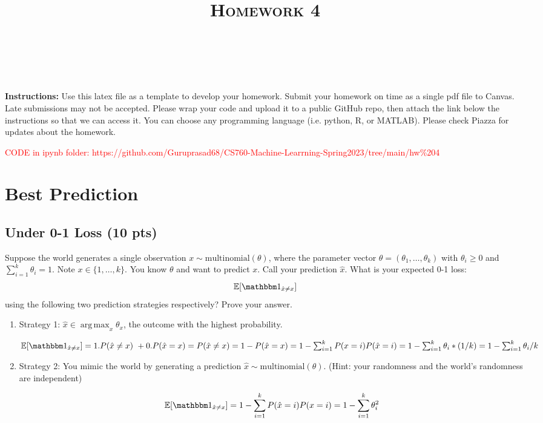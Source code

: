 \documentclass[a4paper]{article}
\title{\textsc{Homework 4}} %
\author{
\red{GURUPRASAD VISWANATHAN RAMESH} \\
\red{viswanathanr@wisc.edu;9082378762}\\
}
\date{}
\theoremstyle{definition}
\DeclareMathOperator*{\argmax}{arg\,max}
\newcommand{\red}[1]{\textcolor{red}{#1}}
\def\E{\mathbb E}
\def\ind{\mathbbm 1}
\newenvironment{soln}{
    \leavevmode\color{blue}\ignorespaces
}{}
\begin{document}
\maketitle 


\textbf{Instructions:} Use this latex file as a template to develop your homework. Submit your homework on time as a single pdf file to Canvas. Late submissions may not be accepted. Please wrap your code and upload it to a public GitHub repo, then attach the link below the instructions so that we can access it. You can choose any programming language (i.e. python, R, or MATLAB). Please check Piazza for updates about the homework.

\red{CODE in ipynb folder: https://github.com/Guruprasad68/CS760-Machine-Learrning-Spring2023/tree/main/hw\%204}
\section{Best Prediction}
\subsection{Under 0-1 Loss (10 pts)}
Suppose the world generates a single observation $x \sim \mbox{multinomial}(\theta)$, where the parameter vector $\theta=(\theta_1, \ldots, \theta_k)$ with $\theta_i\ge 0$ and $\sum_{i=1}^k \theta_i=1$.  Note $x \in \{1, \ldots, k\}$.
You know $\theta$ and want to predict $x$. 
Call your prediction $\hat x$.  What is your expected 0-1 loss: 
$$\E[\ind_{\hat x \neq x}]$$
using the following two prediction strategies respectively?  Prove your answer.
\begin{enumerate}
    \item Strategy 1: $\hat x \in \argmax_x \theta_x$, the outcome with the highest probability.\\
    \begin{soln}
    $\E[\ind_{\hat x \neq x}]=1.P (\hat x \neq x)\ + 0.P(\hat x=x)=P(\hat x \neq x)=1-P(\hat x=x)=1 -\sum_{i=1}^k P(x=i)P(\hat x=i)= 1 - \sum_{i=1}^k \theta_i*(1/k)= 1 - \sum_{i=1}^k \theta_i/k$
    \end{soln}
    

    \item Strategy 2: You mimic the world by generating a prediction $\hat x \sim \mbox{multinomial}(\theta)$.  (Hint: your randomness and the world's randomness are independent)
    \begin{soln}
       $$\E[\ind_{\hat x \neq x}] = 1 - \sum_{i=1}^k P(\hat x =i)P(x=i) = 1 - \sum_{i=1}^k \theta_i^2$$ 
    \end{soln}
\end{enumerate}
\end{document}
